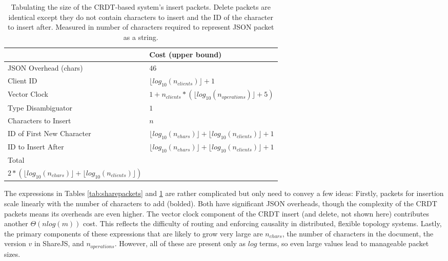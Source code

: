 \documentclass[12pt,a4paper,twoside,openright]{report}
\begin{document}
			\begin{table}[H]
			\centering
			\caption[CRDT System Insert Packet Size]{Tabulating the size of the CRDT-based system's insert packets. Delete packets are identical except they do not contain characters to insert and the ID of the character to insert after. Measured in number of characters required to represent JSON packet as a string.}
			\label{tab:crdtinsertpacket}
			\setlength{\tabcolsep}{10pt}
			\begin{tabular}{@{}ll@{}}
			
                             & Cost (upper bound)\\ \toprule                                                                                                                                                       
			JSON Overhead (chars)      & $46$ \\ \midrule
			Client ID                       & $\lfloor log_{10}(n_{clients}) \rfloor+1$  \\ \midrule
			Vector Clock                    & $1 + n_{clients} * (\lfloor log_{10}(n_{operations}) \rfloor + 5)$ \\ \midrule
			Type Disambiguator              & $1$ \\ \midrule
			Characters to Insert            & $n$ \\ \midrule
			ID of First New Character       & $\lfloor log_{10}(n_{chars}) \rfloor + \lfloor log_{10}(n_{clients}) \rfloor  +1$  \\ \midrule
			ID to Insert After & $\lfloor log_{10}(n_{chars}) \rfloor + \lfloor log_{10}(n_{clients}) \rfloor +  1$  \\ \bottomrule
			Total                           & \makecell{$51 + \boldsymbol{n} + \boldsymbol{5n_{clients}} + \boldsymbol{n_{clients} *\lfloor log_{10}(n_{_{operations}})\rfloor} +$ \\ $2*(\lfloor log_{10}(n_{chars}) \rfloor + \lfloor log_{10}(n_{clients}) \rfloor)$}
			\end{tabular}
			\end{table}
			
			
			
			The expressions in Tables \ref{tab:sharepackets} and \ref{tab:crdtinsertpacket} are rather complicated but only need to convey a few ideas: Firstly, packets for insertion scale linearly with the number of characters to add (bolded). Both have significant JSON overheads, though the complexity of the CRDT packets means its overheads are even higher. The vector clock component of the CRDT insert (and delete, not shown here) contributes another $\Theta(nlog(m))$ cost. This reflects the difficulty of routing and enforcing causality in distributed, flexible topology systems. Lastly, the primary components of these expressions that are likely to grow very large are $n_{chars}$, the number of characters in the document, the version $v$ in ShareJS, and $n_{operations}$. However, all of these are present only as $log$ terms, so even large values lead to manageable packet sizes.
			
\end{document}
